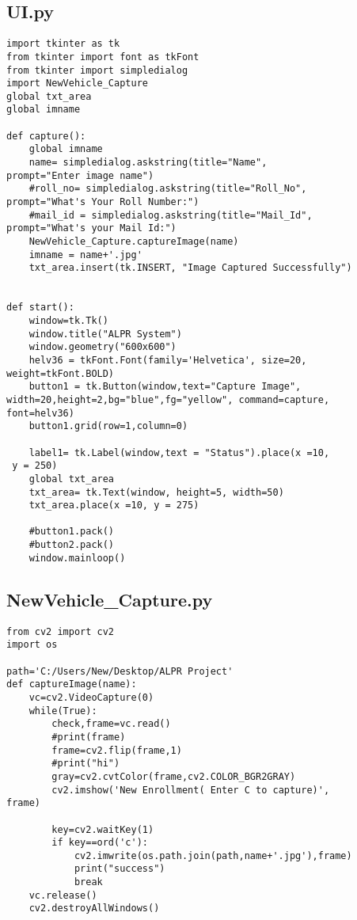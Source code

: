 \documentclass[12pt,a4paper]{report}
\begin{document}
\subsection{UI.py}
\begin{lstlisting}
import tkinter as tk
from tkinter import font as tkFont
from tkinter import simpledialog
import NewVehicle_Capture
global txt_area
global imname

def capture():
    global imname
    name= simpledialog.askstring(title="Name",
prompt="Enter image name")
    #roll_no= simpledialog.askstring(title="Roll_No",
prompt="What's Your Roll Number:")
    #mail_id = simpledialog.askstring(title="Mail_Id",
prompt="What's your Mail Id:")
    NewVehicle_Capture.captureImage(name)
    imname = name+'.jpg'
    txt_area.insert(tk.INSERT, "Image Captured Successfully")
    
    
def start():
    window=tk.Tk()
    window.title("ALPR System")
    window.geometry("600x600")
    helv36 = tkFont.Font(family='Helvetica', size=20,
weight=tkFont.BOLD)
    button1 = tk.Button(window,text="Capture Image",
width=20,height=2,bg="blue",fg="yellow", command=capture,
font=helv36)
    button1.grid(row=1,column=0)

    label1= tk.Label(window,text = "Status").place(x =10,
 y = 250)
    global txt_area
    txt_area= tk.Text(window, height=5, width=50)
    txt_area.place(x =10, y = 275)

    #button1.pack()
    #button2.pack()
    window.mainloop()
\end{lstlisting}

\newpage
\subsection{NewVehicle\_Capture.py}
\begin{lstlisting}
from cv2 import cv2
import os

path='C:/Users/New/Desktop/ALPR Project'
def captureImage(name):
    vc=cv2.VideoCapture(0)
    while(True):
        check,frame=vc.read()
        #print(frame)
        frame=cv2.flip(frame,1)
        #print("hi")
        gray=cv2.cvtColor(frame,cv2.COLOR_BGR2GRAY)
        cv2.imshow('New Enrollment( Enter C to capture)',
frame)

        key=cv2.waitKey(1)
        if key==ord('c'):
            cv2.imwrite(os.path.join(path,name+'.jpg'),frame)
            print("success")
            break
    vc.release()
    cv2.destroyAllWindows()
\end{lstlisting}
\newpage
\end{document}
